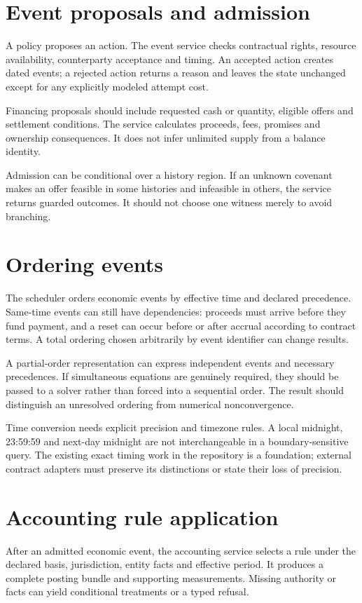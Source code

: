 \section{Event proposals and admission}
A policy proposes an action. The event service checks contractual rights, resource availability, counterparty acceptance and timing. An accepted action creates dated events; a rejected action returns a reason and leaves the state unchanged except for any explicitly modeled attempt cost.

Financing proposals should include requested cash or quantity, eligible offers and settlement conditions. The service calculates proceeds, fees, promises and ownership consequences. It does not infer unlimited supply from a balance identity.

Admission can be conditional over a history region. If an unknown covenant makes an offer feasible in some histories and infeasible in others, the service returns guarded outcomes. It should not choose one witness merely to avoid branching.

\section{Ordering events}
The scheduler orders economic events by effective time and declared precedence. Same-time events can still have dependencies: proceeds must arrive before they fund payment, and a reset can occur before or after accrual according to contract terms. A total ordering chosen arbitrarily by event identifier can change results.

A partial-order representation can express independent events and necessary precedences. If simultaneous equations are genuinely required, they should be passed to a solver rather than forced into a sequential order. The result should distinguish an unresolved ordering from numerical nonconvergence.

Time conversion needs explicit precision and timezone rules. A local midnight, 23:59:59 and next-day midnight are not interchangeable in a boundary-sensitive query. The existing exact timing work in the repository is a foundation; external contract adapters must preserve its distinctions or state their loss of precision.

\section{Accounting rule application}
After an admitted economic event, the accounting service selects a rule under the declared basis, jurisdiction, entity facts and effective period. It produces a complete posting bundle and supporting measurements. Missing authority or facts can yield conditional treatments or a typed refusal.

